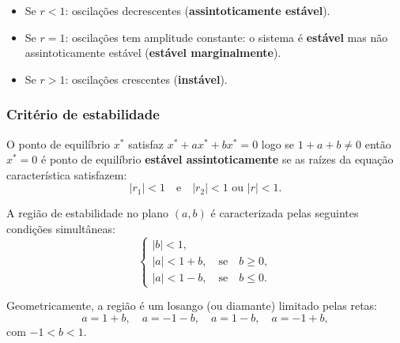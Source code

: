 \documentclass{article}
\begin{document}
\begin{itemize}
  \item Se $r < 1$: oscilações decrescentes (\textbf{assintoticamente estável}).
  \item Se $r = 1$: oscilações tem amplitude constante: o sistema é
    \textbf{estável} mas não assintoticamente estável (\textbf{estável
      marginalmente}).
  \item Se $r > 1$: oscilações crescentes (\textbf{instável}).
\end{itemize}

\subsubsection{Critério de estabilidade}

O ponto de equilíbrio $x^* $ satisfaz $x^*+ a x^*+ b x^*=0$ logo se
$1+a+b\neq 0$ então $x^*=0$ é ponto de equilíbrio \textbf{estável
  assintoticamente} se as raízes da equação característica satisfazem:
\begin{equation*}
|r_1| < 1 \quad \text{e} \quad |r_2| < 1 \text{ ou } |r| < 1.
\end{equation*}


A região de estabilidade no plano $(a,b)$ é caracterizada pelas seguintes condições simultâneas:
\begin{equation}
\begin{cases}
|b| < 1, \\
|a| < 1 + b, \quad \text{se} \quad b \geq 0, \\
|a| < 1 - b, \quad \text{se} \quad b \leq 0.
\end{cases}
\end{equation}

Geometricamente, a região é um losango (ou diamante) limitado pelas retas:
\[
a = 1+b, \quad a = -1-b, \quad a = 1-b, \quad a = -1+b,
\]
com $-1 < b < 1$.


\begin{center}
\end{center}
\end{document}
